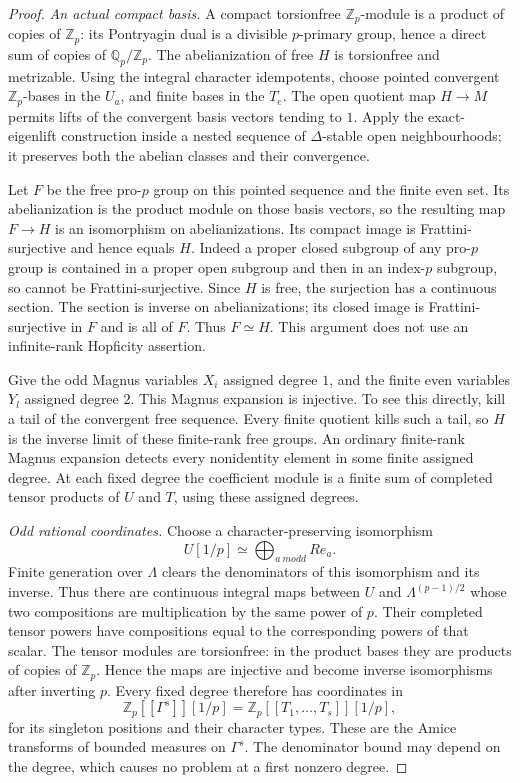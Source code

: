 \documentclass[11pt,a4paper]{article}
\theoremstyle{definition}
\begin{document}
\begin{proof}
\emph{An actual compact basis.}
A compact torsionfree $\mathbb Z_p$-module is a product of copies of
$\mathbb Z_p$: its Pontryagin dual is a divisible $p$-primary group,
hence a direct sum of copies of $\mathbb Q_p/\mathbb Z_p$.
The abelianization of free $H$ is torsionfree and metrizable.
Using the integral character idempotents, choose pointed convergent
$\mathbb Z_p$-bases in the $U_a$, and finite bases in the $T_e$.
The open quotient map $H\to M$ permits lifts of the convergent
basis vectors tending to $1$. Apply the exact-eigenlift construction
inside a nested sequence of $\Delta$-stable open neighbourhoods;
it preserves both the abelian classes and their convergence.

Let $F$ be the free pro-$p$ group on this pointed sequence and the
finite even set. Its abelianization is the product module on those
basis vectors, so the resulting map $F\to H$ is an isomorphism on
abelianizations. Its compact image is Frattini-surjective and hence
equals $H$. Indeed a proper closed subgroup of any pro-$p$ group is
contained in a proper open subgroup and then in an index-$p$ subgroup,
so cannot be Frattini-surjective. Since $H$ is free, the surjection
has a continuous section. The section is inverse on abelianizations;
its closed image is Frattini-surjective in $F$ and is all of $F$.
Thus $F\simeq H$. This argument does not use an infinite-rank
Hopficity assertion.

Give the odd Magnus variables $X_i$ assigned degree $1$, and the
finite even variables $Y_l$ assigned degree $2$. This Magnus
expansion is injective. To see this directly, kill a tail of the
convergent free sequence. Every finite quotient kills such a tail,
so $H$ is the inverse limit of these finite-rank free groups.
An ordinary finite-rank Magnus expansion detects every nonidentity
element in some finite assigned degree. At each fixed degree the
coefficient module is a finite sum of completed tensor products of
$U$ and $T$, using these assigned degrees.

\emph{Odd rational coordinates.}
Choose a character-preserving isomorphism
\[
 U[1/p]\simeq\bigoplus_{a\ {
m odd}}Re_a.
\]
Finite generation over $\Lambda$ clears the denominators of this
isomorphism and its inverse. Thus there are continuous integral
maps between $U$ and $\Lambda^{(p-1)/2}$ whose two compositions are
multiplication by the same power of $p$. Their completed tensor
powers have compositions equal to the corresponding powers of that
scalar. The tensor modules are torsionfree: in the product bases
they are products of copies of $\mathbb Z_p$. Hence the maps are
injective and become inverse isomorphisms after inverting $p$.
Every fixed degree therefore has coordinates in
\[
 \mathbb Z_p[[\Gamma^s]][1/p]
   =\mathbb Z_p[[T_1,\ldots,T_s]][1/p],                       \tag{GM.2}
\]
for its singleton positions and their character types. These are
the Amice transforms of bounded measures on $\Gamma^s$.
The denominator bound may depend on the degree, which causes no
problem at a first nonzero degree.


\end{proof}
\end{document}
